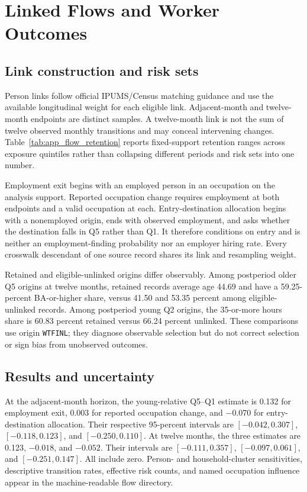 \section{Linked Flows and Worker Outcomes}\label{app:flows}

\subsection{Link construction and risk sets}

Person links follow official IPUMS/Census matching guidance and use the available longitudinal weight for each eligible link.  Adjacent-month and twelve-month endpoints are distinct samples.  A twelve-month link is not the sum of twelve observed monthly transitions and may conceal intervening changes.  Table~\ref{tab:app_flow_retention} reports fixed-support retention ranges across exposure quintiles rather than collapsing different periods and risk sets into one number.

Employment exit begins with an employed person in an occupation on the analysis support.  Reported occupation change requires employment at both endpoints and a valid occupation at each.  Entry-destination allocation begins with a nonemployed origin, ends with observed employment, and asks whether the destination falls in Q5 rather than Q1.  It therefore conditions on entry and is neither an employment-finding probability nor an employer hiring rate.  Every crosswalk descendant of one source record shares its link and resampling weight.



Retained and eligible-unlinked origins differ observably.  Among postperiod
older Q5 origins at twelve months, retained records average age 44.69 and have
a 59.25-percent BA-or-higher share, versus 41.50 and 53.35 percent among
eligible-unlinked records.  Among postperiod young Q2 origins, the 35-or-more
hours share is 60.83 percent retained versus 66.24 percent unlinked.  These
comparisons use origin \texttt{WTFINL}; they diagnose observable selection but
do not correct selection or sign bias from unobserved outcomes.

\subsection{Results and uncertainty}

At the adjacent-month horizon, the young-relative Q5--Q1 estimate is 0.132 for employment exit, 0.003 for reported occupation change, and $-0.070$ for entry-destination allocation.  Their respective 95-percent intervals are $[-0.042,0.307]$, $[-0.118,0.123]$, and $[-0.250,0.110]$.  At twelve months, the three estimates are 0.123, $-0.018$, and $-0.052$.  Their intervals are $[-0.111,0.357]$, $[-0.097,0.061]$, and $[-0.251,0.147]$.  All include zero.  Person- and household-cluster sensitivities, descriptive transition rates, effective risk counts, and named occupation influence appear in the machine-readable flow directory.

